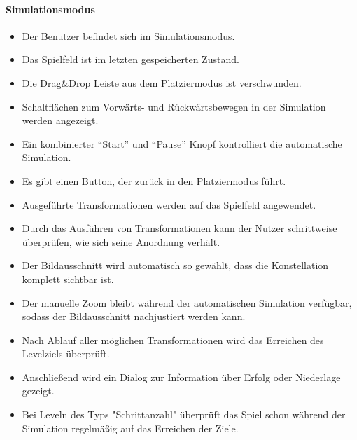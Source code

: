 \paragraph{Simulationsmodus}
\begin{itemize}
\item Der Benutzer befindet sich im Simulationsmodus.
\item Das Spielfeld ist im letzten gespeicherten Zustand.
\item Die Drag\&Drop Leiste aus dem Platziermodus ist verschwunden.
\item Schaltflächen zum Vorwärts- und Rückwärtsbewegen in der Simulation werden angezeigt.
\item Ein kombinierter "`Start"' und "`Pause"' Knopf kontrolliert die automatische Simulation.
\item Es gibt einen Button, der zurück in den Platziermodus führt.
\item Ausgeführte Transformationen werden auf das Spielfeld angewendet.
\item Durch das Ausführen von Transformationen kann der Nutzer schrittweise
überprüfen, wie sich seine Anordnung verhält.
\item Der Bildausschnitt wird automatisch so gewählt, dass die Konstellation komplett sichtbar ist.
\item Der manuelle Zoom bleibt während der automatischen Simulation verfügbar, sodass der Bildausschnitt nachjustiert werden kann.
\item Nach Ablauf aller möglichen Transformationen wird das Erreichen des Levelziels überprüft.
\item Anschließend wird ein Dialog zur Information über Erfolg oder Niederlage gezeigt.
\item Bei Leveln des Typs "Schrittanzahl" überprüft das Spiel schon während der Simulation regelmäßig auf das Erreichen
der Ziele.
\end{itemize}

